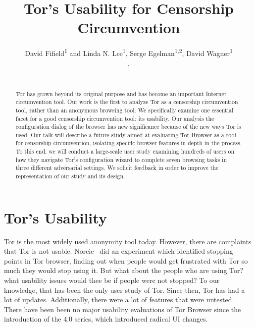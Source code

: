 \documentclass{sig-alternate-hotpets15}
\begin{document}
\title{Tor's Usability for Censorship Circumvention}
\author{
 \alignauthor David Fifield\textsuperscript{1} and Linda N. Lee\textsuperscript{1}, Serge Egelman\textsuperscript{1,2}, David Wagner\textsuperscript{1}\\
   \vspace{0.5em}
   , \\
   \\
}
\maketitle

\begin{abstract}

Tor has grown beyond its original purpose and has become an important Internet circumvention tool.
Our work is the first to analyze Tor as a censorship circumvention tool, rather than an anonymous browsing tool. 
We specifically examine one  essential facet for a good censorship circumvention tool: its usability. 
Our analysis the configuration dialog of the browser has new significance because of the new ways Tor is used.
Our talk will describe a future study aimed at evaluating Tor Browser as a tool for censorship circumvention,
 isolating specific browser features in depth in the process. 
To this end, we will conduct a large-scale user study examining hundreds of users 
on how they navigate Tor's configuration wizard to complete seven browsing tasks in three different adversarial settings. 
We solicit feedback in order to improve the representation of our study and its design.
\end{abstract}


\section{Tor's Usability}

Tor is the most widely used anonymity tool today. However, there are complaints that Tor is not usable. Norcie~\cite{norcie2012eliminating} did an experiment which identified stopping points in Tor browser, 
finding out when people would get frustrated with Tor so much they would stop using it. 
But what about the people who are using Tor? what usability issues would thee be if people were not stopped? 
To our knowledge, that has been the only user study of Tor. 
Since then, Tor has had a lot of updates. 
Additionally, there were a lot of features that were untested. 
There have been been no major usability evaluations of
Tor Browser since the introduction of the 4.0 series,
which introduced radical UI changes.
\end{document}
